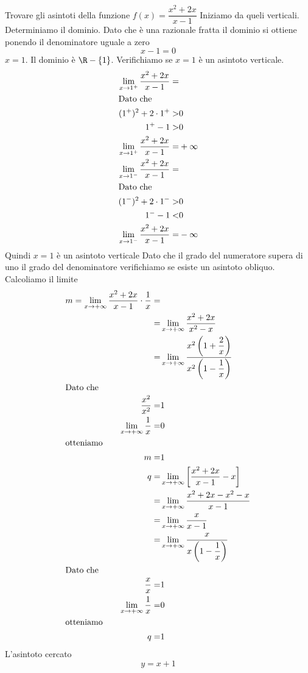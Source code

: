 \begin{exercise}
	Trovare gli asintoti della funzione $f(x)=\dfrac{x^2+2x}{x-1}$
	\tcblower
Iniziamo da queli verticali. Determiniamo il dominio. Dato che è una razionale fratta il dominio si ottiene ponendo il denominatore uguale a zero\[x-1=0\] $x=1$. Il dominio è $\R-\lbrace1\rbrace$. Verifichiamo se $x=1$ è un asintoto verticale.
\begin{align*}
\lim_{x\to 1^+}\dfrac{x^2+2x}{x-1}=&\\
\intertext{Dato che}
(1^+)^2+2\cdot 1^+>&0\\
1^+-1>&0\\
\lim_{x\to 1^+}\dfrac{x^2+2x}{x-1}=&+\infty\\
\lim_{x\to 1^-}\dfrac{x^2+2x}{x-1}=&\\
\intertext{Dato che}
(1^-)^2+2\cdot 1^->&0\\
1^--1<&0\\
\lim_{x\to 1^-}\dfrac{x^2+2x}{x-1}=&-\infty\\
\end{align*}
Quindi $x=1$ è un asintoto verticale
Dato che il grado del numeratore supera di uno il grado del denominatore verifichiamo se esiste un asintoto obliquo. Calcoliamo il limite
\begin{align*}
m=\lim_{x\to +\infty}\dfrac{x^2+2x}{x-1}\cdot\dfrac{1}{x}=&\\
=&\lim_{x\to +\infty}\dfrac{x^2+2x}{x^2-x}\\
=&\lim_{x\to +\infty}\dfrac{x^2\left(1+\dfrac{2}{x}\right)}{x^2\left(1-\dfrac{1}{x}\right)}\\
\intertext{Dato che}
\dfrac{x^2}{x^2}=&1\\
\lim_{x\to +\infty}\dfrac{1}{x}=&0\\
\intertext{otteniamo}
m=&1\\
q=&\lim_{x\to +\infty}\left[\dfrac{x^2+2x}{x-1}-x\right]\\
=&\lim_{x\to +\infty}\dfrac{x^2+2x-x^2-x}{x-1}\\
=&\lim_{x\to +\infty}\dfrac{x}{x-1}\\
=&\lim_{x\to +\infty}\dfrac{x}{x\left(1-\dfrac{1}{x}\right)}\\
\intertext{Dato che}
\dfrac{x}{x}=&1\\
\lim_{x\to +\infty}\dfrac{1}{x}=&0\\
\intertext{otteniamo}
q=&1\\
\end{align*}
L'asintoto cercato\[y=x+1\]
\end{exercise}
